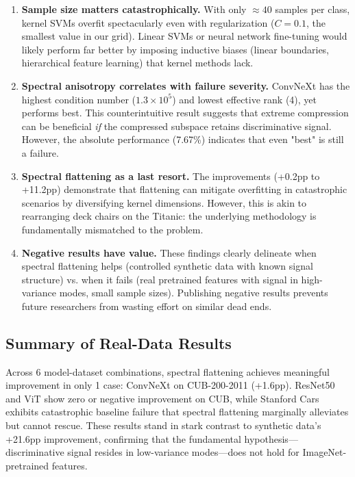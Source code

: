 \documentclass[11pt]{article}
\begin{document}
\begin{enumerate}
\item \textbf{Sample size matters catastrophically.} With only $\approx 40$ samples per class, kernel SVMs overfit spectacularly even with regularization ($C=0.1$, the smallest value in our grid). Linear SVMs or neural network fine-tuning would likely perform far better by imposing inductive biases (linear boundaries, hierarchical feature learning) that kernel methods lack.

\item \textbf{Spectral anisotropy correlates with failure severity.} ConvNeXt has the highest condition number ($1.3 \times 10^5$) and lowest effective rank (4), yet performs best. This counterintuitive result suggests that extreme compression can be beneficial \emph{if} the compressed subspace retains discriminative signal. However, the absolute performance (7.67\%) indicates that even "best" is still a failure.

\item \textbf{Spectral flattening as a last resort.} The improvements (+0.2pp to +11.2pp) demonstrate that flattening can mitigate overfitting in catastrophic scenarios by diversifying kernel dimensions. However, this is akin to rearranging deck chairs on the Titanic: the underlying methodology is fundamentally mismatched to the problem.

\item \textbf{Negative results have value.} These findings clearly delineate when spectral flattening helps (controlled synthetic data with known signal structure) vs. when it fails (real pretrained features with signal in high-variance modes, small sample sizes). Publishing negative results prevents future researchers from wasting effort on similar dead ends.
\end{enumerate}

\subsection{Summary of Real-Data Results}

Across 6 model-dataset combinations, spectral flattening achieves meaningful improvement in only 1 case: ConvNeXt on CUB-200-2011 (+1.6pp). ResNet50 and ViT show zero or negative improvement on CUB, while Stanford Cars exhibits catastrophic baseline failure that spectral flattening marginally alleviates but cannot rescue. These results stand in stark contrast to synthetic data's +21.6pp improvement, confirming that the fundamental hypothesis---discriminative signal resides in low-variance modes---does not hold for ImageNet-pretrained features.
\end{document}

